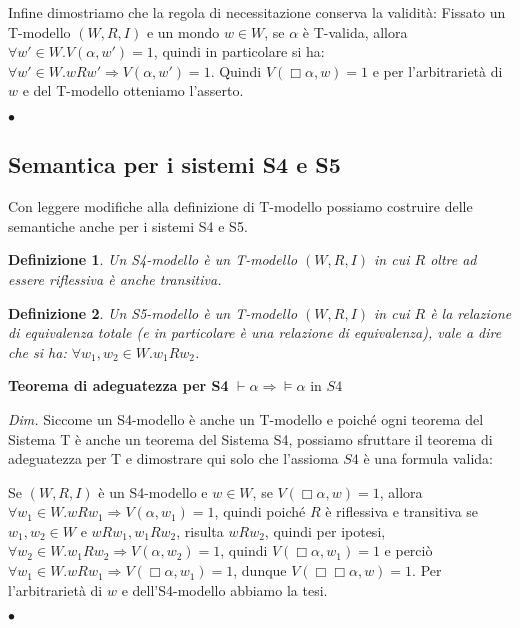 \documentclass[a4paper, titlepage, 12pt]{report}
\newtheorem{definition}{Definizione}
\begin{document}
\begin{flushleft}
Infine dimostriamo che la regola di necessitazione conserva la validità:
Fissato un T-modello $(W, R, I)$ e un mondo $w \in W$,
se $\alpha$ è T-valida, allora $\forall w' \in W.V(\alpha, w') = 1$,
quindi in particolare si ha: $\forall w' \in W. wRw' \Rightarrow V(\alpha, w') = 1$.
Quindi $V(\Box \alpha, w) = 1$ e per l'arbitrarietà di $w$ e del T-modello otteniamo l'asserto.


\begin{flushright}
$\bullet$
\end{flushright}
\end{flushleft}

\subsection{Semantica per i sistemi S4 e S5}
Con leggere modifiche alla definizione di T-modello possiamo costruire delle semantiche
anche per i sistemi S4 e S5.

\begin{definition}
Un S4-modello è un T-modello $(W, R, I)$ in cui $R$ oltre ad essere riflessiva è anche transitiva.
\end{definition}

\begin{definition}
Un S5-modello è un T-modello $(W, R, I)$ in cui $R$ è la relazione di equivalenza totale
(e in particolare è una relazione di equivalenza),
vale a dire che si ha: $\forall w_1, w_2 \in W. w_1 R w_2$.
\end{definition}

\begin{flushleft}
\textbf{Teorema di adeguatezza per S4}
$\vdash \alpha \Rightarrow \vDash \alpha$ in $S4$

\textit{Dim.}
Siccome un S4-modello è anche un T-modello e poiché ogni teorema del Sistema T
è anche un teorema del Sistema S4, possiamo sfruttare il teorema di adeguatezza per T
e dimostrare qui solo che l'assioma $S4$ è una formula valida:

Se $(W, R, I)$ è un S4-modello e $w \in W$,
se $V(\Box \alpha, w) = 1$, allora $\forall w_1 \in W. wRw_1 \Rightarrow V(\alpha, w_1) = 1$,
quindi poiché $R$ è riflessiva e transitiva
se $w_1, w_2 \in W$ e $wRw_1, w_1Rw_2$, risulta $wRw_2$, quindi per ipotesi,
$\forall w_2 \in W. w_1Rw_2 \Rightarrow V(\alpha, w_2) = 1$, quindi $V(\Box \alpha, w_1) = 1$
e perciò $\forall w_1 \in W. wRw_1 \Rightarrow V(\Box \alpha, w_1) = 1$,
dunque $V(\Box \Box \alpha, w) = 1$.
Per l'arbitrarietà di $w$ e dell'S4-modello abbiamo la tesi.


\begin{flushright}
$\bullet$
\end{flushright}
\end{flushleft}
\end{document}

